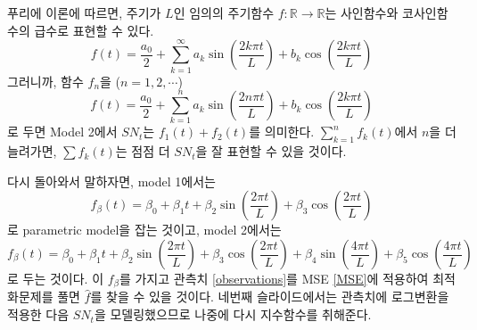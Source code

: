 \documentclass{article}
\begin{document}
푸리에 이론에 따르면, 주기가 \(L\)인 임의의 주기함수 \(f:\mathbb R\to\mathbb R\)는 사인함수와 코사인함수의 급수로 표현할 수 있다.
\[f(t) = \frac{a_0}2+\sum_{k=1}^\infty a_k\sin\left(\frac{2k\pi t}L\right)+b_k\cos\left(\frac{2k\pi t}L\right)\]
그러니까, 함수 \(f_n\)을 (\(n=1,2,\cdots\))
\[f(t) = \frac{a_0}2+\sum_{k=1}^n a_k\sin\left(\frac{2n\pi t}L\right)+b_k\cos\left(\frac{2k\pi t}L\right)\]
로 두면 Model 2에서 \(SN_t\)는 \(f_1(t)+f_2(t)\)를 의미한다.
\(\sum_{k=1}^nf_k(t)\)에서 \(n\)을 더 늘려가면, \(\sum f_k(t)\)는 점점 더 \(SN_t\)을 잘 표현할 수 있을 것이다.

다시 돌아와서 말하자면, model 1에서는
\[f_\beta(t)=\beta_0+\beta_1t+\beta_2\sin\left(\frac{2\pi t}L\right)+\beta_3\cos\left(\frac{2\pi t}L\right)\]
로 parametric model을 잡는 것이고, model 2에서는
\[f_\beta(t)=\beta_0+\beta_1t+\beta_2\sin\left(\frac{2\pi t}L\right)+\beta_3\cos\left(\frac{2\pi t}L\right)
+\beta_4\sin\left(\frac{4\pi t}L\right)+\beta_5\cos\left(\frac{4\pi t}L\right)\]
로 두는 것이다.
이 \(f_\beta\)를 가지고 관측치 \eqref{observations}를 MSE \eqref{MSE}에 적용하여 최적화문제를 풀면 \(\hat f\)를 찾을 수 있을 것이다.
네번째 슬라이드에서는 관측치에 로그변환을 적용한 다음 \(SN_t\)을 모델링했으므로 나중에 다시 지수함수를 취해준다.

\end{document}

